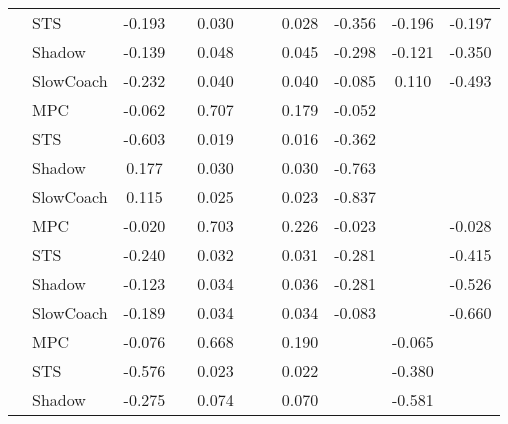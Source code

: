 \begin{tabular}{|l|l|*{9}{c|}}
                                                           & STS &   -0.193 &        &     0.030 &     &     &  0.028 &  -0.356 &  -0.196 &   -0.197 \\
                                                           & Shadow &   -0.139 &        &     0.048 &     &     &  0.045 &  -0.298 &  -0.121 &   -0.350 \\
                                                           & SlowCoach &   -0.232 &        &     0.040 &     &     &  0.040 &  -0.085 &   0.110 &   -0.493 \\
\midrule
[True, False, True, False, False, True, True, False, False] & MPC &   -0.062 &        &     0.707 &     &     &  0.179 &  -0.052 &      &       \\
                                                           & STS &   -0.603 &        &     0.019 &     &     &  0.016 &  -0.362 &      &       \\
                                                           & Shadow &    0.177 &        &     0.030 &     &     &  0.030 &  -0.763 &      &       \\
                                                           & SlowCoach &    0.115 &        &     0.025 &     &     &  0.023 &  -0.837 &      &       \\
\midrule
[True, False, True, False, False, True, True, False, True] & MPC &   -0.020 &        &     0.703 &     &     &  0.226 &  -0.023 &      &   -0.028 \\
                                                           & STS &   -0.240 &        &     0.032 &     &     &  0.031 &  -0.281 &      &   -0.415 \\
                                                           & Shadow &   -0.123 &        &     0.034 &     &     &  0.036 &  -0.281 &      &   -0.526 \\
                                                           & SlowCoach &   -0.189 &        &     0.034 &     &     &  0.034 &  -0.083 &      &   -0.660 \\
\midrule
[True, False, True, False, False, True, False, True, False] & MPC &   -0.076 &        &     0.668 &     &     &  0.190 &      &  -0.065 &       \\
                                                           & STS &   -0.576 &        &     0.023 &     &     &  0.022 &      &  -0.380 &       \\
                                                           & Shadow &   -0.275 &        &     0.074 &     &     &  0.070 &      &  -0.581 &       \\

\end{tabular}
